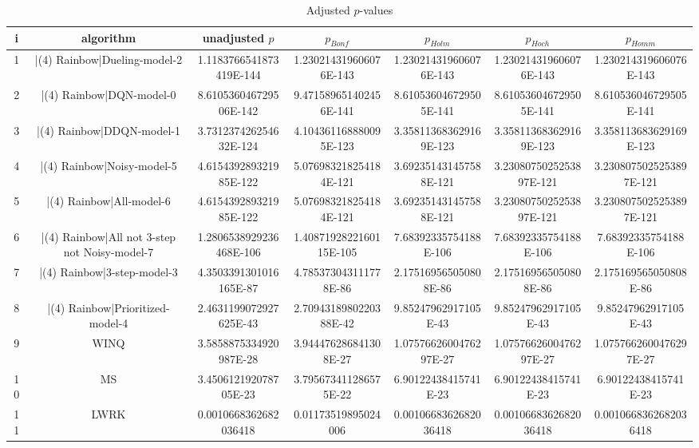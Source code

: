 \documentclass[a3paper,10pt]{article}
\begin{document}
\begin{table}[!htp]
\centering\tiny
\caption{Adjusted $p$-values}
\begin{tabular}{ccccccc}
i&algorithm&unadjusted $p$&$p_{Bonf}$&$p_{Holm}$&$p_{Hoch}$&$p_{Homm}$\\
\hline
1&|(4) Rainbow|Dueling-model-2&1.1183766541873419E-144&1.230214319606076E-143&1.230214319606076E-143&1.230214319606076E-143&1.230214319606076E-143\\
2&|(4) Rainbow|DQN-model-0&8.610536046729506E-142&9.471589651402456E-141&8.610536046729505E-141&8.610536046729505E-141&8.610536046729505E-141\\
3&|(4) Rainbow|DDQN-model-1&3.731237426254632E-124&4.104361168880095E-123&3.358113683629169E-123&3.358113683629169E-123&3.358113683629169E-123\\
4&|(4) Rainbow|Noisy-model-5&4.615439289321985E-122&5.076983218254184E-121&3.692351431457588E-121&3.2308075025253897E-121&3.2308075025253897E-121\\
5&|(4) Rainbow|All-model-6&4.615439289321985E-122&5.076983218254184E-121&3.692351431457588E-121&3.2308075025253897E-121&3.2308075025253897E-121\\
6&|(4) Rainbow|All not 3-step not Noisy-model-7&1.2806538929236468E-106&1.4087192822160115E-105&7.68392335754188E-106&7.68392335754188E-106&7.68392335754188E-106\\
7&|(4) Rainbow|3-step-model-3&4.3503391301016165E-87&4.785373043111778E-86&2.175169565050808E-86&2.175169565050808E-86&2.175169565050808E-86\\
8&|(4) Rainbow|Prioritized-model-4&2.4631199072927625E-43&2.7094318980220388E-42&9.85247962917105E-43&9.85247962917105E-43&9.85247962917105E-43\\
9&WINQ&3.5858875334920987E-28&3.944476286841308E-27&1.0757662600476297E-27&1.0757662600476297E-27&1.0757662600476297E-27\\
10&MS&3.450612192078705E-23&3.795673411286575E-22&6.90122438415741E-23&6.90122438415741E-23&6.90122438415741E-23\\
11&LWRK&0.0010668362682036418&0.01173519895024006&0.0010668362682036418&0.0010668362682036418&0.0010668362682036418\\
\hline
\end{tabular}
\end{table}
\end{document}
